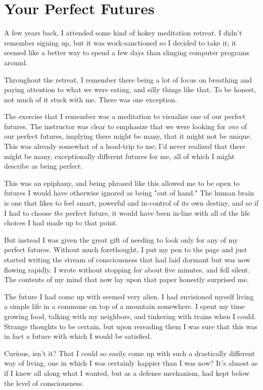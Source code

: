 \documentclass[../the-millions-of-gestures.tex]{subfiles}
\begin{document}
\chapter{Your Perfect Futures}

A few years back, I attended some kind of hokey meditation retreat. I didn't
remember signing up, but it was work-sanctioned so I decided to take it; it
seemed like a better way to spend a few days than slinging computer programs
around.

Throughout the retreat, I remember there being a lot of focus on breathing and
paying attention to what we were eating, and silly things like that. To be
honest, not much of it stuck with me. There was one exception.

The exercise that I remember was a meditation to visualize one of our perfect
futures. The instructor was clear to emphasize that we were looking for
\emph{one} of our perfect futures, implying there might be many, that it
might not be unique. This was already somewhat of a head-trip to me; I'd never
realized that there might be many, exceptionally different futures for me, all
of which I might describe as being perfect.

This was an epiphany, and being phrased like this allowed me to be open to
futures I would have otherwise ignored as being "out of hand." The human brain
is one that likes to feel smart, powerful and in-control of its own destiny, and
so if I had to choose \emph{the} perfect future, it would have been in-line
with all of the life choices I had made up to that point.

But instead I was given the great gift of needing to look only for any of my
perfect futures. Without much forethought, I put my pen to the page and just
started writing the stream of consciousness that had laid dormant but was now
flowing rapidly. I wrote without stopping for about five minutes, and fell
silent. The contents of my mind that now lay upon that paper honestly surprised
me.

The future I had come up with seemed very alien. I had envisioned myself living
a simple life in a commune on top of a mountain somewhere. I spent my time
growing food, talking with my neighbors, and tinkering with trains when I could.
Strange thoughts to be certain, but upon rereading them I was sure that this was
in fact a future with which I would be satisfied.

Curious, isn't it? That I could so easily come up with such a drastically
different way of living, one in which I was certainly happier than I was now?
It's almost as if I knew all along what I wanted, but as a defense mechanism,
had kept below the level of consciousness.
\end{document}
